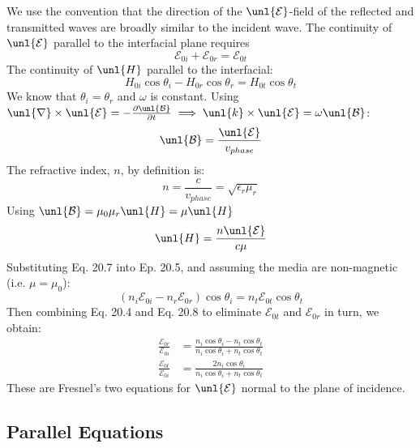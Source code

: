 \documentclass[a4paper, 11pt, normalem]{report}
\newcommand\p{\partial}
\newcommand\E{\mathcal{E}}
\newcommand\uE{\unl{\E}}
\newcommand\B{\mathcal{B}}
\newcommand\uB{\unl{\B}}
\newcommand\del{\unl{\nabla}}
\newcommand\vk{\unl{k}}
\newcommand\om{\omega}
\newcommand\er{\epsilon_r}
\begin{document}
We use the convention that the direction of the $\uE$-field of the reflected and transmitted waves are broadly similar to the incident wave.
The continuity of $\uE$ parallel to the interfacial plane requires
\begin{equation}
	\E_{0i} + \E_{0r} = \E_{0t}
\end{equation}
The continuity of $\unl{H}$ parallel to the interfacial:
\begin{equation}
	H_{0i}\cos\theta_i - H_{0r}\cos\theta_r = H_{0t}\cos\theta_t
\end{equation}
We know that $\theta_i = \theta_r$ and $\om$ is constant.
Using $\del\times\uE = -\frac{\p\uB}{\p t} \implies \vk\times\uE = \om\uB$:
\begin{equation}
	\uB = \frac{\uE}{v_{phase}}
\end{equation}
The refractive index, $n$, by definition is:
\begin{equation}
	n = \frac{c}{v_{phase}} = \sqrt{\er\mu_r}
\end{equation}
Using $\uB = \mu_0\mu_r\unl{H} = \mu\unl{H}$
\begin{equation}
	\unl{H} = \frac{n\uE}{c\mu}
\end{equation}
Substituting Eq. 20.7 into Ep. 20.5, and assuming the media are non-magnetic (i.e. $\mu = \mu_0$):
\begin{equation}
	(n_i\E_{0i} - n_r\E_{0r})\cos\theta_i = n_t\E_{0t}\cos\theta_t
\end{equation}
Then combining Eq. 20.4 and Eq. 20.8 to eliminate $\E_{0t}$ and $\E_{0r}$ in turn, we obtain:
\begin{align}
	\frac{\E_{0r}}{\E_{0i}} &= \frac{n_i\cos\theta_i - n_t\cos\theta_t}{n_i\cos\theta_i + n_t\cos\theta_t} \\
	\frac{\E_{0t}}{\E_{0i}} &= \frac{2n_i\cos\theta_i}{n_i\cos\theta_i + n_t\cos\theta_t}
\end{align}
These are Fresnel's two equations for $\uE$ normal to the plane of incidence.

\subsection{Parallel Equations}
\end{document}
